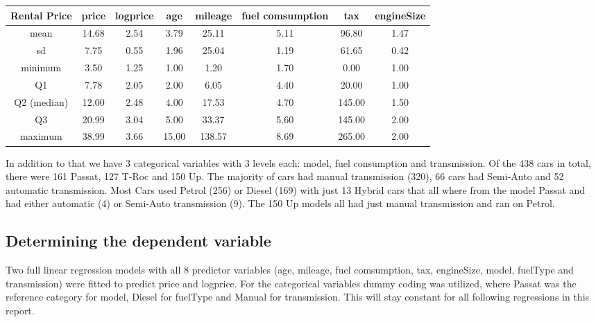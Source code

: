 \documentclass[12 pt]{scrartcl}
\begin{document}
\begin{table}[ht]
  \centering
  \label{tab:descriptives}
  \begin{tabular}{c|cc|ccccc}
    Rental Price & price & logprice & age   & mileage & fuel comsumption & tax    & engineSize \\
    \hline
    mean         & 14.68 & 2.54     & 3.79  & 25.11   & 5.11             & 96.80  & 1.47       \\
    sd           & 7.75  & 0.55     & 1.96  & 25.04   & 1.19             & 61.65  & 0.42       \\
    minimum      & 3.50  & 1.25     & 1.00  & 1.20    & 1.70             & 0.00   & 1.00       \\
    Q1           & 7.78  & 2.05     & 2.00  & 6.05    & 4.40             & 20.00  & 1.00       \\
    Q2 (median)  & 12.00 & 2.48     & 4.00  & 17.53   & 4.70             & 145.00 & 1.50       \\
    Q3           & 20.99 & 3.04     & 5.00  & 33.37   & 5.60             & 145.00 & 2.00       \\
    maximum      & 38.99 & 3.66     & 15.00 & 138.57  & 8.69             & 265.00 & 2.00
  \end{tabular}
\end{table}

In addition to that we have 3 categorical variables with 3 levels each: model, fuel consumption and transmission. Of the 438 cars in total, there were 161 Passat, 127 T-Roc and 150 Up. The majority of cars had manual transmission (320), 66 cars had Semi-Auto and 52 automatic transmission. Most Cars used Petrol (256) or Diesel (169) with just 13 Hybrid cars that all where from the model Passat and had either automatic (4) or Semi-Auto transmission (9). The 150 Up models all had just manual transmission and ran on Petrol.

\subsection{Determining the dependent variable}

Two full linear regression models with all 8 predictor variables (age, mileage, fuel comsumption, tax, engineSize, model, fuelType and transmission) were fitted to predict price and logprice. For the categorical variables dummy coding was utilized, where Passat was the reference category for model, Diesel for fuelType and Manual for transmission. This will stay constant for all following regressions in this report.
\end{document}
